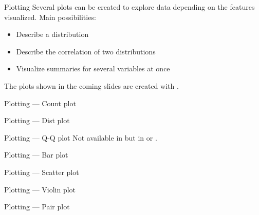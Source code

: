 \begin{frame}{Plotting}
  Several plots can be created to explore data depending on the features visualized. Main possibilities:

  \begin{itemize}
  \item Describe a distribution
  \item Describe the correlation of two distributions
  \item Visualize summaries for several variables at once
  \end{itemize}
  The plots shown in the coming slides are created with
  .
\end{frame}

\begin{frame}{Plotting — Count plot}
\end{frame}

\begin{frame}{Plotting — Dist plot}
\end{frame}

\begin{frame}{Plotting — Q-Q plot}
  Not available in 
  but in
  or
  .
\end{frame}

\begin{frame}{Plotting — Bar plot}
\end{frame}

\begin{frame}{Plotting — Scatter plot}
\end{frame}

\begin{frame}{Plotting — Violin plot}
\end{frame}

\begin{frame}{Plotting — Pair plot}
\end{frame}

